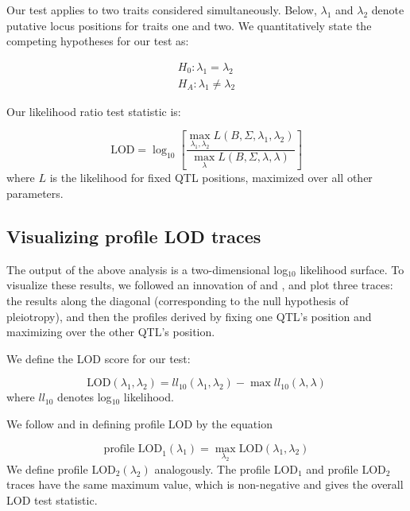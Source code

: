 \documentclass[oneside]{book}\usepackage[]{graphicx}\usepackage[]{color}
\begin{document}
Our test applies to two traits considered simultaneously. Below,
$\lambda_1$ and $\lambda_2$ denote putative locus positions for traits
one and two. We quantitatively state the competing hypotheses for our
test as:

\begin{eqnarray}
H_0: \lambda_1 = \lambda_2 \nonumber\\
H_A: \lambda_1 \neq \lambda_2
\label{eqn:hypotheses}
\end{eqnarray}

\noindent Our likelihood ratio test statistic is:

\begin{equation}
\text{LOD} = \log_{10} \left[ \frac{\max_{\lambda_1, \lambda_2} L(B, \Sigma, \lambda_1, \lambda_2)}{
    \max_\lambda L(B, \Sigma, \lambda, \lambda)} \right]
\label{eqn:test-statistic}
\end{equation}
where $L$ is the likelihood for fixed QTL positions,
maximized over all other parameters.

\subsection{Visualizing profile LOD traces}

The output of the above analysis is a two-dimensional log$_{10}$ likelihood
surface. To visualize these results, we followed an innovation of \citet{zeng2000genetic} and
\citet{tian2016dissection}, and plot three traces: the results along the
diagonal (corresponding to the null hypothesis of pleiotropy), and
then the profiles derived by fixing one QTL's position
and maximizing over the other QTL's position.

We define the LOD score for our test:

\begin{equation}
\text{LOD}(\lambda_1, \lambda_2) = ll_{10}(\lambda_1, \lambda_2) - \max ll_{10}(\lambda, \lambda)
\label{eq:lodpvl}
\end{equation}
where $ll_{10}$ denotes log$_{10}$ likelihood.

We follow \citet{zeng2000genetic} and \citet{tian2016dissection} in
defining profile LOD by the equation

\begin{equation}
\text{profile LOD}_1(\lambda_1) = \max_{\lambda_2}\text{LOD}(\lambda_1, \lambda_2)
\label{eq:profilelod}
\end{equation}
We define profile LOD$_2(\lambda_2)$ analogously.
The profile LOD$_1$ and
profile LOD$_2$ traces have the same maximum value, which is
non-negative and gives the overall LOD test statistic.
\end{document}
